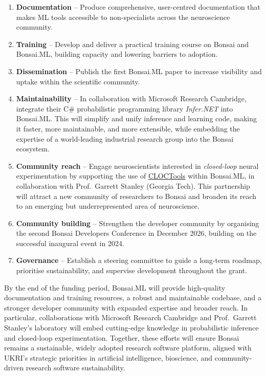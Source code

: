\begin{enumerate}

  \item \textbf{Documentation} – Produce comprehensive, user-centred
documentation that makes ML tools accessible to non-specialists across the
neuroscience community.  

  \item \textbf{Training} – Develop and deliver a practical training course on
Bonsai and Bonsai.ML, building capacity and lowering barriers to adoption.  

  \item \textbf{Dissemination} – Publish the first Bonsai.ML paper to increase
      visibility and uptake within the scientific community.

  \item \textbf{Maintainability} – In collaboration with Microsoft Research
  Cambridge, integrate their C\# probabilistic programming library
  \emph{Infer.NET} into Bonsai.ML. This will simplify and unify inference and
  learning code, making it faster, more maintainable, and more extensible,
  while embedding the expertise of a world-leading industrial research group
  into the Bonsai ecosystem.

  \item \textbf{Community reach} – Engage neuroscientists interested in
\emph{closed-loop} neural experimentation by supporting the use of
\href{https://cloctools.github.io/}{CLOCTools} within Bonsai.ML, in
collaboration with Prof.~Garrett Stanley (Georgia Tech). This partnership will
attract a new community of researchers to Bonsai and broaden its reach to an
emerging but underrepresented area of neuroscience.

  \item \textbf{Community building} – Strengthen the developer community by
organising the second Bonsai Developers Conference in December 2026, building
on the successful inaugural event in 2024.  

  \item \textbf{Governance} – Establish a steering committee to guide a
long-term roadmap, prioritise sustainability, and supervise development
throughout the grant.

\end{enumerate}

By the end of the funding period, Bonsai.ML will provide high-quality
documentation and training resources, a robust and maintainable codebase, and a
stronger developer community with expanded expertise and broader reach. In
particular, collaborations with Microsoft Research Cambridge and
Prof.~Garrett Stanley’s laboratory will embed cutting-edge knowledge in
probabilistic inference and closed-loop experimentation. Together, these
efforts will ensure Bonsai remains a sustainable, widely adopted research
software platform, aligned with UKRI’s strategic priorities in artificial
intelligence, bioscience, and community-driven research software
sustainability.


